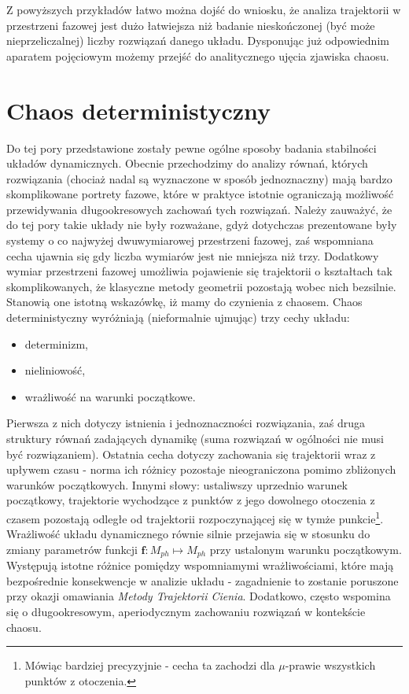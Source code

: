 \documentclass[12pt, twoside]{book}
\begin{document}
Z powyższych przykładów łatwo można dojść do wniosku, że analiza trajektorii w przestrzeni fazowej jest dużo łatwiejsza niż badanie nieskończonej (być może nieprzeliczalnej) liczby rozwiązań danego układu. Dysponując już odpowiednim aparatem pojęciowym możemy przejść do analitycznego ujęcia zjawiska chaosu.
\section{Chaos deterministyczny}
Do tej pory przedstawione zostały pewne ogólne sposoby badania stabilności układów dynamicznych. Obecnie przechodzimy do analizy równań, których rozwiązania (chociaż nadal są wyznaczone w sposób jednoznaczny) mają bardzo skomplikowane portrety fazowe, które w praktyce istotnie ograniczają możliwość przewidywania długookresowych zachowań tych rozwiązań. Należy zauważyć, że do tej pory takie układy nie były rozważane, gdyż dotychczas prezentowane były systemy o co najwyżej dwuwymiarowej przestrzeni fazowej, zaś wspomniana cecha ujawnia się gdy liczba wymiarów jest nie mniejsza niż trzy. Dodatkowy wymiar przestrzeni fazowej umożliwia pojawienie się trajektorii o kształtach tak skomplikowanych, że klasyczne metody geometrii pozostają wobec nich bezsilnie. Stanowią one istotną wskazówkę, iż mamy do czynienia z chaosem. \newline
Chaos deterministyczny wyróżniają (nieformalnie ujmując) trzy cechy układu:
\begin{itemize}
	\item determinizm,
	\item nieliniowość,
	\item wrażliwość na warunki początkowe.
\end{itemize} 
Pierwsza z nich dotyczy istnienia i jednoznaczności rozwiązania, zaś druga struktury równań zadających dynamikę (suma rozwiązań w ogólności nie musi być rozwiązaniem). Ostatnia cecha dotyczy zachowania się trajektorii wraz z upływem czasu - norma ich różnicy pozostaje nieograniczona pomimo zbliżonych warunków początkowych. Innymi słowy: ustaliwszy uprzednio warunek początkowy, trajektorie wychodzące z punktów z jego dowolnego otoczenia z czasem pozostają odległe od trajektorii rozpoczynającej się w tymże punkcie\footnote{Mówiąc bardziej precyzyjnie - cecha ta zachodzi dla $ \mu $-prawie wszystkich punktów z otoczenia.}. Wrażliwość układu dynamicznego równie silnie przejawia się w stosunku do zmiany parametrów funkcji  $ \textbf{f}:M_{ph} \mapsto M_{ph}  $ przy ustalonym warunku początkowym. Występują istotne różnice pomiędzy wspomniamymi wrażliwościami, które mają bezpośrednie konsekwencje w analizie układu - zagadnienie to zostanie poruszone przy okazji omawiania \textit{Metody Trajektorii Cienia}. Dodatkowo, często wspomina się o długookresowym, aperiodycznym zachowaniu rozwiązań w kontekście chaosu. \newline
\end{document}
